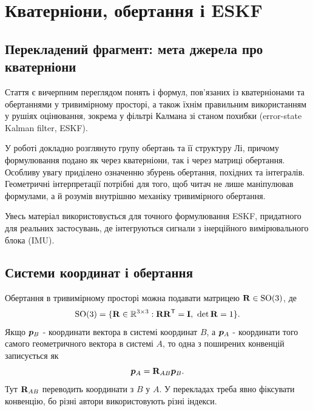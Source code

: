 \chapter{Кватерніони, обертання і ESKF}

\section{Перекладений фрагмент: мета джерела про кватерніони}


Стаття є вичерпним переглядом понять і формул, пов'язаних із кватерніонами та обертаннями у тривимірному просторі, а також їхнім правильним використанням у рушіях оцінювання, зокрема у фільтрі Калмана зі станом похибки (error-state Kalman filter, ESKF).

У роботі докладно розглянуто групу обертань та її структуру Лі, причому формулювання подано як через кватерніони, так і через матриці обертання. Особливу увагу приділено означенню збурень обертання, похідних та інтегралів. Геометричні інтерпретації потрібні для того, щоб читач не лише маніпулював формулами, а й розумів внутрішню механіку тривимірного обертання.

Увесь матеріал використовується для точного формулювання ESKF, придатного для реальних застосувань, де інтегруються сигнали з інерційного вимірювального блока (IMU).

\section{Системи координат і обертання}

Обертання в тривимірному просторі можна подавати матрицею $\mathbf{R}\in\mathrm{SO}(3)$, де
\begin{equation}
    \mathrm{SO}(3)=\{\mathbf{R}\in\mathbb{R}^{3\times 3}:\mathbf{R}\mathbf{R}^{\mathsf{T}}=\mathbf{I},\ \det\mathbf{R}=1\}.
\end{equation}
Якщо $\bm{p}_B$ - координати вектора в системі координат $B$, а $\bm{p}_A$ - координати того самого геометричного вектора в системі $A$, то одна з поширених конвенцій записується як
\begin{equation}
    \bm{p}_A = \mathbf{R}_{AB}\bm{p}_B.
\end{equation}
Тут $\mathbf{R}_{AB}$ переводить координати з $B$ у $A$. У перекладах треба явно фіксувати конвенцію, бо різні автори використовують різні індекси.

